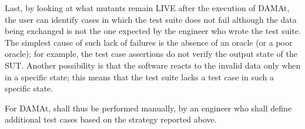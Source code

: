  
Last, by looking at what mutants remain LIVE after the execution of DAMAt, the user can identify cases in which the test suite does not fail although the data being exchanged is not the one expected by the engineer who wrote the test suite. 
The simplest cause of such lack of failures is the absence of an oracle (or a poor oracle); for example, the test case assertions do not verify the output state of the SUT. 
Another possibility is that the software reacts to the invalid data only when in a specific state; this means that the test suite lacks a test case in such a specific state.

For DAMAt,  shall thus be performed manually, by an engineer who shall define additional test cases based on the strategy reported above.

